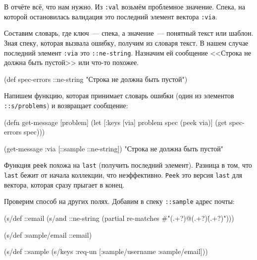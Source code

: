 В отчёте всё, что нам нужно. Из \verb|:val| возьмём проблемное
значение. Спека, на которой остановилась валидация это последний элемент вектора
\verb|:via|.

Составим словарь, где ключ~--- спека, а значение~--- понятный текст или
шаблон. Зная спеку, которая вызвала ошибку, получим из словаря текст. В нашем
случае последний элемент \verb|:via| это \verb|::ne-string|. Назначим ей
сообщение <<Строка не должна быть пустой>> или что-то похожее.

  \begin{clojure}
(def spec-errors
  {::ne-string "Строка не должна быть пустой"})
  \end{clojure}

Напишем функцию, которая принимает словарь ошибки (один из элементов
\verb|::s/problems|) и возвращает сообщение:


  \begin{clojure}
(defn get-message [problem]
  (let [{:keys [via]} problem
        spec (peek via)]
    (get spec-errors spec)))

(get-message {:via [::sample ::ne-string]})
"Строка не должна быть пустой"
  \end{clojure}

Функция \verb|peek| похожа на \verb|last| (получить последний
элемент). Разница в том, что \verb|last| бежит от начала коллекции, что
неэффективно. \verb|Peek| это версия \verb|last| для вектора, которая сразу
прыгает в конец.

Проверим способ на других полях. Добавим в спеку \verb|::sample| адрес почты:


\begin{english}
  \begin{clojure}
(s/def ::email
  (s/and
   ::ne-string
   (partial re-matches #"(.+?)@(.+?)\.(.+?)")))

(s/def :sample/email ::email)

(s/def ::sample
  (s/keys :req-un [:sample/username
                   :sample/email]))
  \end{clojure}
\end{english}

